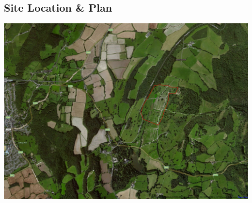 \pagestyle{empty}
\begin{landscape}
\section{Site Location \& Plan}
\label{site-plan}
\includegraphics[width=24cm]{./supplementary/wide-map.png}
\end{landscape}


